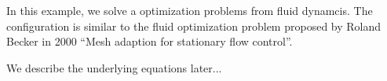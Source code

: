 In this example, we solve a optimization problems from 
fluid dynamcis. The configuration is similar to 
the fluid optimization problem proposed by Roland Becker 
in 2000 ``Mesh adaption for stationary flow control''.

We describe the underlying equations later...

